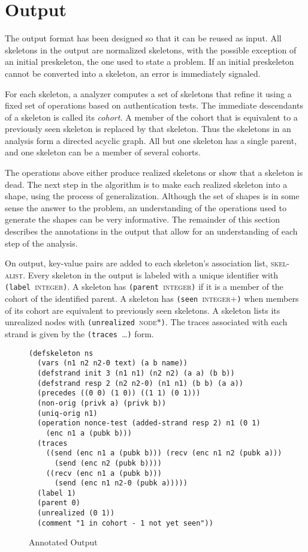 \documentclass[12pt]{article}
\begin{document}
\section{Output}\label{sec:output}

The {\cpsa} output format has been designed so that it can be reused
as input.  All skeletons in the output are normalized skeletons,
with the possible exception of an initial preskeleton, the one used to
state a problem.  If an initial preskeleton cannot be converted into a
skeleton, an error is immediately signaled.

For each skeleton, a {\cpsa} analyzer computes a set of skeletons that
refine it using a fixed set of operations based on authentication
tests.  The immediate descendants of a skeleton is called its
\emph{cohort.}  A member of the cohort that is
equivalent to a previously seen skeleton is replaced by that skeleton.
Thus the skeletons in an analysis form a directed acyclic graph.  All
but one skeleton has a single parent, and one skeleton can be a member
of several cohorts.

The operations above either produce realized skeletons or show that a
skeleton is dead.  The next step in the algorithm is to make each
realized skeleton into a shape, using the process of generalization.
Although the set of shapes is in some sense the answer to the problem,
an understanding of the operations used to generate the shapes can be
very informative.  The remainder of this section describes the
annotations in the output that allow for an understanding of each step
of the analysis.

On output, key-value pairs are added to each skeleton's association
list, \textsc{skel-alist}.  Every skeleton in the output is labeled
with a unique identifier with
\texttt{(label~}\textsc{integer}\texttt{)}.  A skeleton
has \texttt{(parent~}\textsc{integer}\texttt{)} if it is a member of
the cohort of the identified parent.  A skeleton has
\texttt{(seen~}\textsc{integer+}\texttt{)} when members of its cohort
are equivalent to previously seen skeletons.  A skeleton lists its
unrealized nodes with
\texttt{(unrealized~}\textsc{node$\ast$}\texttt{)}.  The traces
associated with each strand is given by the
\texttt{(traces~}\ldots\texttt{)} form.

\begin{figure}
\begin{verbatim}
(defskeleton ns
  (vars (n1 n2 n2-0 text) (a b name))
  (defstrand init 3 (n1 n1) (n2 n2) (a a) (b b))
  (defstrand resp 2 (n2 n2-0) (n1 n1) (b b) (a a))
  (precedes ((0 0) (1 0)) ((1 1) (0 1)))
  (non-orig (privk a) (privk b))
  (uniq-orig n1)
  (operation nonce-test (added-strand resp 2) n1 (0 1)
    (enc n1 a (pubk b)))
  (traces
    ((send (enc n1 a (pubk b))) (recv (enc n1 n2 (pubk a)))
      (send (enc n2 (pubk b))))
    ((recv (enc n1 a (pubk b)))
      (send (enc n1 n2-0 (pubk a)))))
  (label 1)
  (parent 0)
  (unrealized (0 1))
  (comment "1 in cohort - 1 not yet seen"))
\end{verbatim}
\caption{Annotated {\cpsa} Output}\label{fig:output}
\end{figure}
\end{document}
